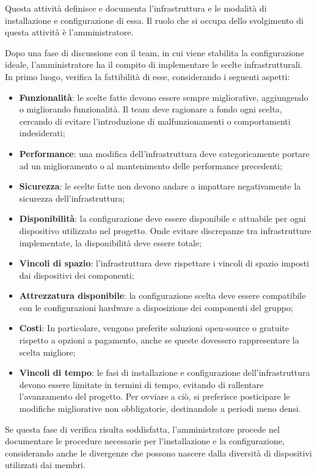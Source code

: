 \documentclass[10pt, a4paper]{article}
\begin{document}
Questa attività definisce e documenta l'infrastruttura e le modalità di installazione e configurazione di essa.
Il ruolo che si occupa dello svolgimento di questa attività è l'amministratore.

Dopo una fase di discussione con il team, in cui viene stabilita la configurazione ideale, l'amministratore ha il compito di implementare le scelte infrastrutturali.
In primo luogo, verifica la fattibilità di esse, considerando i seguenti aspetti:
\begin{itemize}
    \item \textbf{Funzionalità}: le scelte fatte devono essere sempre migliorative, aggiungendo o migliorando funzionalità. Il team deve ragionare a fondo ogni scelta, cercando di evitare l'introduzione di malfunzionamenti o comportamenti indesiderati;
    \item \textbf{Performance}: una modifica dell'infrastruttura deve categoricamente portare ad un miglioramento o al mantenimento delle performance precedenti;
    \item \textbf{Sicurezza}: le scelte fatte non devono andare a impattare negativamente la sicurezza dell'infrastruttura;
    \item \textbf{Disponibilità}: la configurazione deve essere disponibile e attuabile per ogni dispositivo utilizzato nel progetto. Onde evitare discrepanze tra infrastrutture implementate, la disponibilità deve essere totale;
    \item \textbf{Vincoli di spazio}: l'infrastruttura deve rispettare i vincoli di spazio imposti dai dispositivi dei componenti;
    \item \textbf{Attrezzatura disponibile}: la configurazione scelta deve essere compatibile con le configurazioni hardware a disposizione dei componenti del gruppo;
    \item \textbf{Costi}: In particolare, vengono preferite soluzioni open-source o gratuite rispetto a opzioni a pagamento, anche se queste dovessero rappresentare la scelta migliore;
    \item \textbf{Vincoli di tempo}: le fasi di installazione e configurazione dell'infrastruttura devono essere limitate in termini di tempo, evitando di rallentare l'avanzamento del progetto. Per ovviare a ciò, si preferisce posticipare le modifiche migliorative non obbligatorie, destinandole a periodi meno densi.
\end{itemize}

Se questa fase di verifica risulta soddisfatta, l'amministratore procede nel documentare le procedure necessarie per l'installazione e la configurazione, considerando anche le divergenze che possono nascere dalla diversità di dispositivi utilizzati dai membri.
\end{document}
